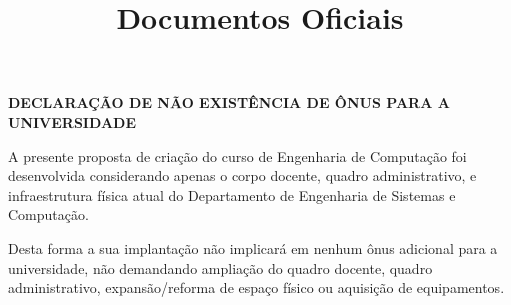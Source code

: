 \documentclass[oneside,envcountsame,envcountchap,openany]{svmono}
\title{Documentos Oficiais}
\begin{document}
\pagestyle{empty}
\thispagestyle{empty}
\begin{center}
      \textbf{DECLARAÇÃO DE NÃO EXISTÊNCIA DE ÔNUS PARA A UNIVERSIDADE}
\end{center}
A presente proposta de criação do curso de Engenharia de Computação foi desenvolvida considerando apenas o corpo
docente, quadro administrativo, e infraestrutura física atual do Departamento de Engenharia de Sistemas e Computação.

Desta forma a sua implantação não implicará em nenhum ônus adicional para a universidade,
não demandando ampliação do quadro docente, quadro administrativo, expansão/reforma de
espaço físico ou aquisição de equipamentos.
\end{document}
